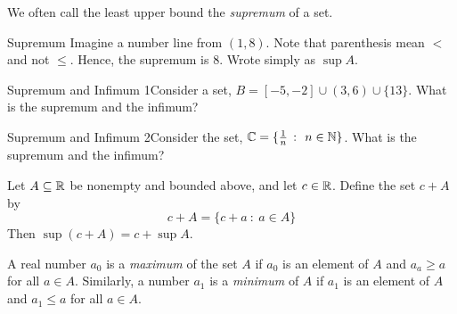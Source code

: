 We often call the least upper bound the \textit{supremum} of a set. 

\begin{example}
    {Supremum} Imagine a number line from \((1,8)\). Note that parenthesis mean \(<\) and not \(\leq\). Hence, the supremum is \(8\). Wrote simply as \(\sup A\).
\end{example}




\begin{example}
    {Supremum and Infimum 1}Consider a set, \(B = [-5,-2] \cup (3,6) \cup \{13\}\). What is the supremum and the infimum?
\end{example}


\begin{example}
    {Supremum and Infimum 2}Consider the set, \(\mathbb{C} = \{\frac{1}{n} \ \colon \ n \in \mathbb{N}\}\). What is the supremum and the infimum?
\end{example}


\begin{example}
    Let \(A \subseteq \mathbb{R}\) be nonempty and bounded above, and let \(c \in \mathbb{R}\). Define the set \(c + A\) by \[c + A = \{c+a \ \colon \ a \in A\}\] Then \(\sup(c + A) = c + \sup A\).
\end{example}


\setcounter{BoxCounter}{3}

\begin{definition}
    A real number \(a_0\) is a \textit{maximum} of the set \(A\) if \(a_0\) is an element of \(A\) and \(a_a \geq a\) for all \(a \in A\). Similarly, a number \(a_1\) is a \textit{minimum} of \(A\) if \(a_1\) is an element of \(A\) and \(a_1 \leq a\) for all \(a \in A\).
\end{definition}

